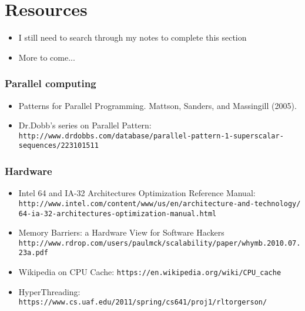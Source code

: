 \section{Resources}
\label{sec:res}

\begin{frame}
  \begin{itemize}
  \item I still need to search through my notes to complete this section
  \item More to come...
  \end{itemize}
\end{frame}

\begin{frame}[fragile]
  \frametitle{Parallel computing}

  \begin{itemize}
  \item Patterns for Parallel Programming. Mattson, Sanders, and Massingill (2005).
    \item Dr.Dobb's series on Parallel Pattern: \tiny\verb+http://www.drdobbs.com/database/parallel-pattern-1-superscalar-sequences/223101511+
  \end{itemize}
\end{frame}

\begin{frame}[fragile]
  \frametitle{Hardware}

  \begin{itemize}
  \item Intel 64 and IA-32 Architectures Optimization Reference Manual: \tiny\verb+http://www.intel.com/content/www/us/en/architecture-and-technology/+
    \tiny\verb+64-ia-32-architectures-optimization-manual.html+
  \item \small Memory Barriers: a Hardware View for Software Hackers
    \tiny\verb+http://www.rdrop.com/users/paulmck/scalability/paper/whymb.2010.07.23a.pdf+
  \item \small Wikipedia on CPU Cache: \verb+https://en.wikipedia.org/wiki/CPU_cache+
  \item \small HyperThreading: \tiny\verb+https://www.cs.uaf.edu/2011/spring/cs641/proj1/rltorgerson/+
  \end{itemize}
\end{frame}


